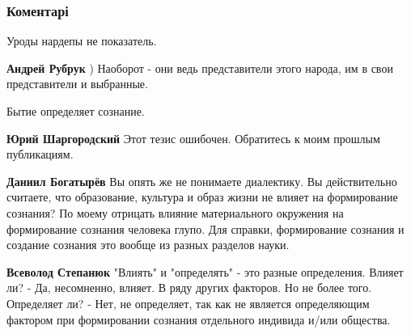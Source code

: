  
 
 
 
 
\subsubsection{Коментарі}
\label{sec:28_11_2021.fb.bogatyrev_daniil.1.obschestvo_amoralnost.cmt}

\begin{itemize} %
Уроды нардепы не показатель.

\textbf{Андрей Рубрук} ) Наоборот - они ведь представители этого народа, им в свои представители и выбранные.

Бытие определяет сознание.

\begin{itemize} %
\textbf{Юрий Шаргородский} Этот тезис ошибочен. Обратитесь к моим прошлым публикациям.

\textbf{Даниил Богатырёв} Вы опять же не понимаете диалектику. Вы действительно считаете, что образование, культура и образ жизни не влияет на формирование сознания? По моему отрицать влияние материального окружения на формирование сознания человека глупо. Для справки, формирование сознания и создание сознания это вообще из разных разделов науки.

\textbf{Всеволод Степанюк} "Влиять" и "определять" - это разные определения. Влияет ли? - Да, несомненно, влияет. В ряду других факторов. Но не более того. Определяет ли? - Нет, не определяет, так как не является определяющим фактором при формировании сознания отдельного индивида и/или общества.



\end{itemize}
\end{itemize}
